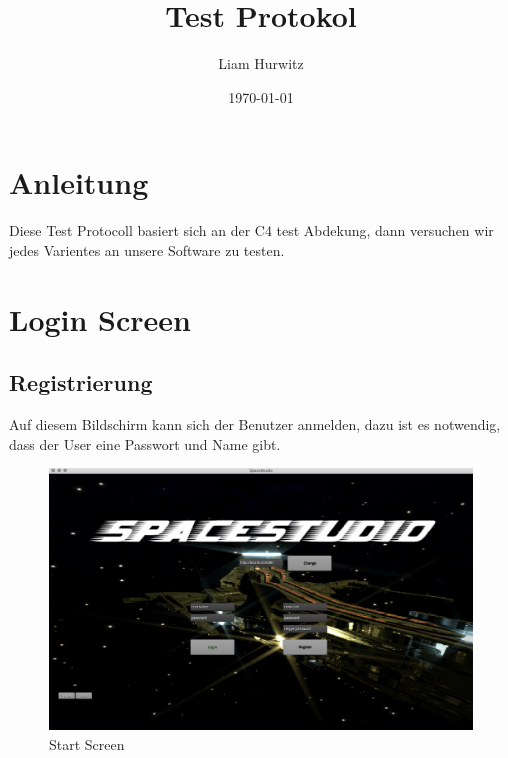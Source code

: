 \documentclass[12pt]{article}
\author{Liam Hurwitz}
\date{\today}
\title{Test Protokol}
\begin{document}
\maketitle
\newpage
\tableofcontents

\newpage
\section{Anleitung}
Diese Test Protocoll basiert sich an der C4 test Abdekung, dann versuchen wir jedes Varientes an unsere Software zu testen.

\section{Login Screen}

\label{sec:orgc5dc561}
\subsection{Registrierung}
Auf diesem Bildschirm kann sich der Benutzer anmelden, dazu ist es notwendig, dass der User eine Passwort und Name gibt.\\
\begin{figure}[htp]
\centering
\includegraphics[scale=0.3]{TestProtocolBilder/startScreen.png}
\caption{Start Screen}
\end{figure}

\newpage
\end{document}
